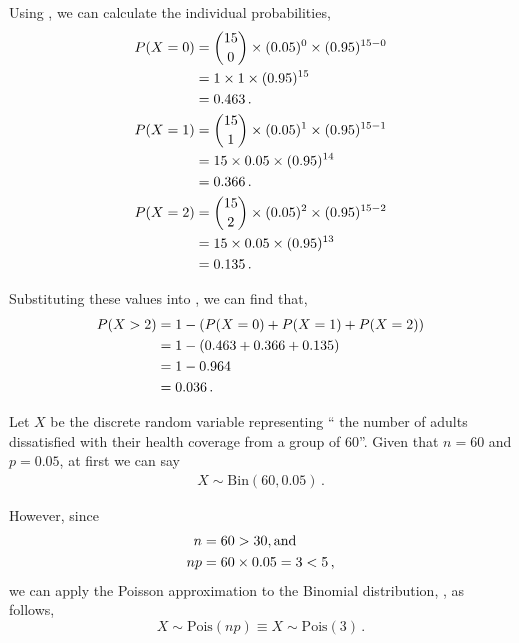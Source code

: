 \begin{subquestions}
\begin{subsubquestions}
\begin{subsubsubquestions}
Using , we can calculate the individual probabilities,
\begin{align}
	P(X=0) & = { 15 \choose 0} \times (0.05)^0 \times (0.95)^{15-0} \nonumber \\
	       & = 1 \times 1 \times (0.95)^{15} \nonumber \\
	       & = 0.463 \,. \\ 
	P(X=1) & = { 15 \choose 1} \times (0.05)^1 \times (0.95)^{15-1} \nonumber \\
	       & = 15 \times 0.05 \times (0.95)^{14} \nonumber \\
	       & = 0.366 \,. \\
	P(X=2) & = { 15 \choose 2} \times (0.05)^2 \times (0.95)^{15-2} \nonumber \\
	       & = 15 \times 0.05 \times (0.95)^{13} \nonumber \\
	       & = 0.135 \,. 
\end{align}

Substituting these values into , we can find that,       
\begin{align}
	P(X>2) & = 1 - (P(X=0)+P(X=1)+P(X=2)) \nonumber \\
	       & = 1 - (0.463+0.366+0.135) \nonumber \\
	       & = 1 - 0.964 \nonumber \\
	       & = 0.036 \,. 
\end{align}

\end{subsubsubquestions}


\subsubquestion

Let $X$ be the discrete random variable representing `` the number of adults dissatisfied with their health coverage from a group of 60''. Given that $n=60$ and $p=0.05$, at first we can say
\begin{align}
X\sim \text{Bin}(60,0.05) \,.
\end{align}

However, since
\begin{align}
	n=60 & >30, \text{and} \nonumber \\
	np = 60 & \times 0.05 = 3 < 5 \,,
\end{align}
we can apply the Poisson approximation to the Binomial distribution, , as follows,
\begin{equation}
	X \sim \text{Pois}(np) \equiv X \sim \text{Pois}(3) \,.
\end{equation}


\end{subsubquestions}
\end{subquestions}
